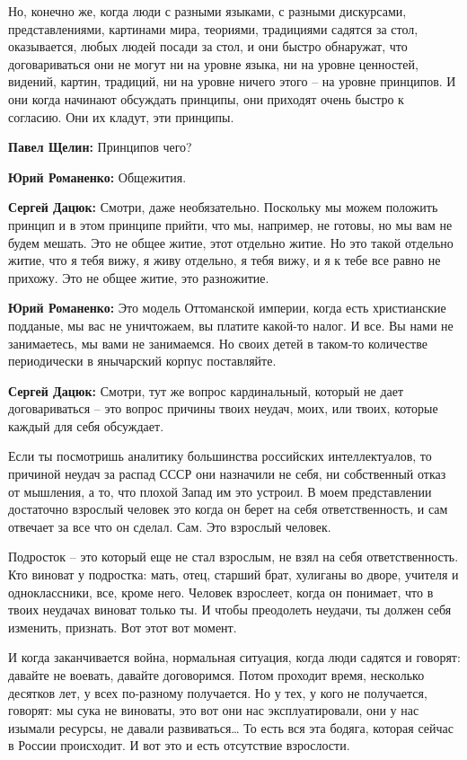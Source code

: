 Но, конечно же, когда люди с разными языками, с разными дискурсами,
представлениями, картинами мира, теориями, традициями садятся за стол,
оказывается, любых людей посади за стол, и они быстро обнаружат, что
договариваться они не могут ни на уровне языка, ни на уровне ценностей,
видений, картин, традиций, ни на уровне ничего этого – на уровне принципов. И
они когда начинают обсуждать принципы, они приходят очень быстро к согласию.
Они их кладут, эти принципы.

\textbf{Павел Щелин:} Принципов чего?

\textbf{Юрий Романенко:} Общежития.

\textbf{Сергей Дацюк:} Смотри, даже необязательно. Поскольку мы можем положить принцип и
в этом принципе прийти, что мы, например, не готовы, но мы вам не будем мешать.
Это не общее житие, этот отдельно житие. Но это такой отдельно житие, что я
тебя вижу, я живу отдельно, я тебя вижу, и я к тебе все равно не прихожу. Это
не общее житие, это разножитие.

\textbf{Юрий Романенко:} Это модель Оттоманской империи, когда есть христианские
подданые, мы вас не уничтожаем, вы платите какой-то налог. И все. Вы нами не
занимаетесь, мы вами не занимаемся. Но своих детей в таком-то количестве
периодически в янычарский корпус поставляйте.

\textbf{Сергей Дацюк:} Смотри, тут же вопрос кардинальный, который не дает
договариваться – это вопрос причины твоих неудач, моих, или твоих, которые
каждый для себя обсуждает.

Если ты посмотришь аналитику большинства российских интеллектуалов, то причиной
неудач за распад СССР они назначили не себя, ни собственный отказ от мышления,
а то, что плохой Запад им это устроил. В моем представлении достаточно взрослый
человек это когда он берет на себя ответственность, и сам отвечает за все что
он сделал. Сам. Это взрослый человек.

Подросток – это который еще не стал взрослым, не взял на себя ответственность.
Кто виноват у подростка: мать, отец, старший брат, хулиганы во дворе, учителя и
одноклассники, все, кроме него. Человек взрослеет, когда он понимает, что в
твоих неудачах виноват только ты. И чтобы преодолеть неудачи, ты должен себя
изменить, признать. Вот этот вот момент.

И когда заканчивается война, нормальная ситуация, когда люди садятся и говорят:
давайте не воевать, давайте договоримся. Потом проходит время, несколько
десятков лет, у всех по-разному получается. Но у тех, у кого не получается,
говорят: мы сука не виноваты, это вот они нас эксплуатировали, они у нас
изымали ресурсы, не давали развиваться… То есть вся эта бодяга, которая сейчас
в России происходит. И вот это и есть отсутствие взрослости.

